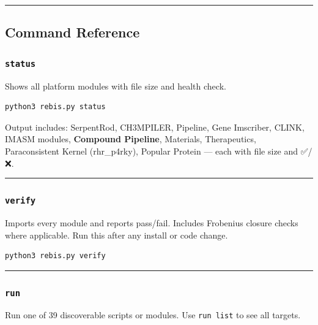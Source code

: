\begin{center}\rule{0.5\linewidth}{0.5pt}\end{center}

\hypertarget{command-reference}{%
\subsection{Command Reference}\label{command-reference}}

\hypertarget{status}{%
\subsubsection{\texorpdfstring{\texttt{status}}{status}}\label{status}}

Shows all platform modules with file size and health check.

\begin{verbatim}
python3 rebis.py status
\end{verbatim}

Output includes: SerpentRod, CH3MPILER, Pipeline, Gene Imscriber, CLINK,
IMASM modules, \textbf{Compound Pipeline}, Materials, Therapeutics,
Paraconsistent Kernel (rhr\_p4rky), Popular Protein --- each with file
size and ✅/❌.

\begin{center}\rule{0.5\linewidth}{0.5pt}\end{center}

\hypertarget{verify}{%
\subsubsection{\texorpdfstring{\texttt{verify}}{verify}}\label{verify}}

Imports every module and reports pass/fail. Includes Frobenius closure
checks where applicable. Run this after any install or code change.

\begin{verbatim}
python3 rebis.py verify
\end{verbatim}

\begin{center}\rule{0.5\linewidth}{0.5pt}\end{center}

\hypertarget{run}{%
\subsubsection{\texorpdfstring{\texttt{run}}{run}}\label{run}}

Run one of 39 discoverable scripts or modules. Use \texttt{run\ list} to
see all targets.

